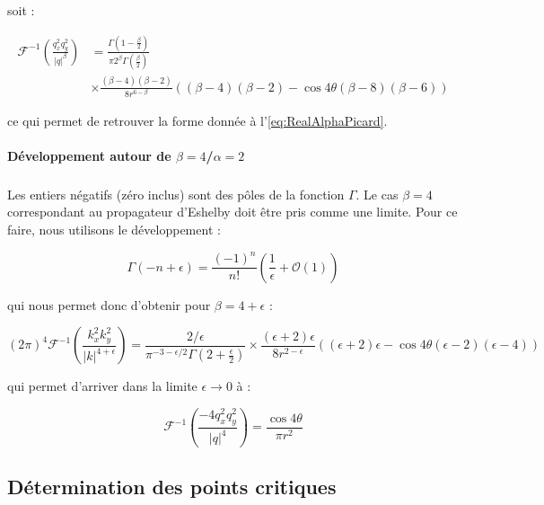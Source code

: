 \noindent soit :

\begin{equation}
\begin{aligned}
    \mathcal{F}^{-1}\left( \frac{q_x^2q_y^2}{\lvert q \rvert^\beta} \right) &= \frac{\Gamma\left( 1-\frac{\beta}{2} \right)}{\pi 2^\beta\Gamma\left( \frac{\beta}{2} \right)}\\
    &\times\frac{(\beta-4)(\beta-2)}{8r^{6-\beta}}\left( (\beta-4)(\beta-2)-\cos4\theta(\beta-8)(\beta-6) \right)
\end{aligned}
\end{equation}

\noindent ce qui permet de retrouver la forme donnée à l'\autoref{eq:RealAlphaPicard}.


\paragraph{Développement autour de $\beta = 4$/$\alpha=2$}

\subparagraph{}Les entiers négatifs (zéro inclus) sont des pôles de la fonction $\Gamma$. Le cas $\beta = 4$ correspondant au propagateur d'Eshelby doit être pris comme une limite. Pour ce faire, nous utilisons le développement :

\begin{equation}
    \Gamma(-n+\epsilon) = \frac{(-1)^n}{n!}\left( \frac{1}{\epsilon}+\mathcal{O}(1) \right)
\end{equation}

\noindent qui nous permet donc d'obtenir pour $\beta=4+\epsilon$ :

\begin{equation}
    (2\pi)^4\mathcal{F}^{-1}\left( \frac{k_x^2k_y^2}{\lvert k \rvert^{4+\epsilon}} \right)=\frac{2/\epsilon}{\pi^{-3-\epsilon/2}\Gamma\left( 2+\frac{\epsilon}{2} \right)}\times\frac{(\epsilon+2)\epsilon}{8r^{2-\epsilon}}((\epsilon+2)\epsilon-\cos4\theta(\epsilon-2)(\epsilon-4))
\end{equation}

\noindent qui permet d'arriver dans la limite $\epsilon \rightarrow 0$ à :

\begin{equation}
    \mathcal{F}^{-1}\left( \frac{-4q_x^2q_y^2}{\lvert q \rvert^{4}} \right)=\frac{\cos4\theta}{\pi r^2}
\end{equation}

\subsection{Détermination des points critiques}

